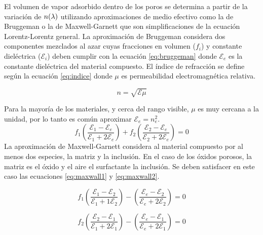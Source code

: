 		El volumen de vapor adsorbido dentro de los poros se determina a partir de la variación de $n(\lambda\index{longitud de onda})$ utilizando aproximaciones de medio efectivo como la de Bruggeman\cite{Bruggeman1935} o la de Maxwell-Garnett\cite{Garnett1906} que son simplificaciones de la ecuación Lorentz-Lorentz  general\cite{TompkinsHarlandG.1999}.
		La aproximación de Bruggeman considera dos componentes mezclados al azar cuyas fracciones en volumen ($f_i$) y constante dieléctrica ($\mathcal{E}_i$) deben cumplir con la ecuación \ref{eq:bruggeman} donde $\mathcal{E}_e$ es la constante dieléctrica del material compuesto. El índice de refracción se define según la ecuación \ref{eq:indice} donde $\mu$ es permeabilidad electromagnética relativa.
		
						\begin{equation}
					 	   n=\sqrt{\mathcal{E}\mu}
					 	   \label{eq:indice}
						\end{equation}
		
		\pagebreak 

		Para la mayoría de los materiales, y cerca del rango visible, $\mu$ es muy cercana a la unidad, por lo tanto es común aproximar $\mathcal{E}_e=n_e^2$.
							\begin{equation}
					 		   	 f_1\left(\frac{\mathcal{E}_1-\mathcal{E}_e}{\mathcal{E}_1+2\mathcal{E}_e}\right)+
					 		   	 f_2\left(\frac{\mathcal{E}_2-\mathcal{E}_e}{\mathcal{E}_2+2\mathcal{E}_e}\right)=0
					 		     \label{eq:bruggeman}
								\end{equation}
		La aproximación de Maxwell-Garnett considera al material compuesto por al menos dos especies, la matriz y la inclusión. En el caso de los óxidos porosos, la matriz es el óxido y el aire el surfactante la inclusión. Se deben satisfacer en este caso las ecuaciones \ref{eq:maxwall1} y \ref{eq:maxwall2}.
				
							\begin{equation}
					 		   	 f_1\left(\frac{\mathcal{E}_1-\mathcal{E}_2}{\mathcal{E}_1+1\mathcal{E}_2}\right)-
					 		   	 \left(\frac{\mathcal{E}_e-\mathcal{E}_2}{\mathcal{E}_e+2\mathcal{E}_2}\right)=0
					 		     \label{eq:maxwall1}
								\end{equation}
						
								\begin{equation}
					 		   	 f_2\left(\frac{\mathcal{E}_2-\mathcal{E}_1}{\mathcal{E}_1+2\mathcal{E}_1}\right)-
					 		   	 \left(\frac{\mathcal{E}_e-\mathcal{E}_1}{\mathcal{E}_e+2\mathcal{E}_1}\right)=0
					 		     \label{eq:maxwall2}
								\end{equation}
		
